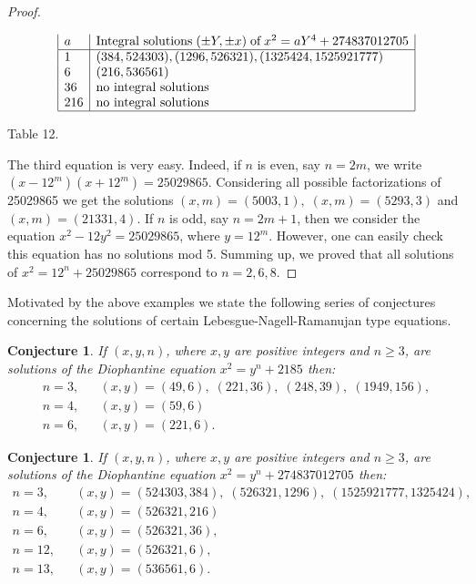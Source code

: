 \documentclass[10pt]{amsart}
\theoremstyle{plain}
\newtheorem{conj}[thm]{Conjecture}
\begin{document}
\begin{proof}
\begin{center}
\begin{equation*}
\begin{array}{|l|l|}
  a          & \mbox{Integral solutions}\;(\pm Y, \pm x)\;\mbox{of}\;x^2=aY^4+274837012705  \\
  \hline
  1          & (384, 524303), (1296, 526321), (1325424, 1525921777)\\
  6          & (216, 536561)\\
  36         & \mbox{no integral solutions} \\
  216        & \mbox{no integral solutions}\\
   \hline
\end{array}
\end{equation*}
\end{center}
\begin{center}
Table 12.
\end{center}

The third equation is very easy. Indeed, if $n$ is even, say $n=2m$, we write $(x-12^m)(x+12^m)=25029865$. Considering all possible factorizations of 25029865 we get the solutions $(x,m)=(5003,1),\;(x,m)=(5293, 3)$ and  $(x,m)=(21331, 4)$. If $n$ is odd, say $n=2m+1$, then we consider the equation $x^2-12y^2=25029865$, where $y=12^{m}$. However, one can easily check this equation has no solutions mod 5. Summing up, we proved that all solutions of $x^2=12^{n}+25029865$ correspond to $n=2,6,8$.

\end{proof}

Motivated by the above examples we state the following series of conjectures concerning the solutions of certain Lebesgue-Nagell-Ramanujan type equations.

\begin{conj}
If $(x,y,n)$, where $x, y$ are positive integers and $n\geq 3$, are solutions of the Diophantine equation $x^2=y^n+2185$ then:
\begin{equation*}
\begin{array}{lll}
  n=3, &  & (x,y)=(49,6),\;(221,36),\;(248,39),\;(1949,156),\\
  n=4, &  & (x,y)=(59,6) \\
  n=6, &  & (x,y)=(221,6).
\end{array}
\end{equation*}
\end{conj}

\begin{conj}
If $(x,y,n)$, where $x, y$ are positive integers and $n\geq 3$, are solutions of the Diophantine equation $x^2=y^n+274837012705$ then:
\begin{equation*}
\begin{array}{lll}
  n=3, &  & (x,y)=(524303, 384),\;(526321, 1296),\;(1525921777, 1325424),\\
  n=4, &  & (x,y)=(526321,216) \\
  n=6, &  & (x,y)=(526321,36),\\
  n=12,&  & (x,y)=(526321,6),\\
  n=13,&  & (x,y)=(536561,6).
\end{array}
\end{equation*}
\end{conj}
\end{document}

